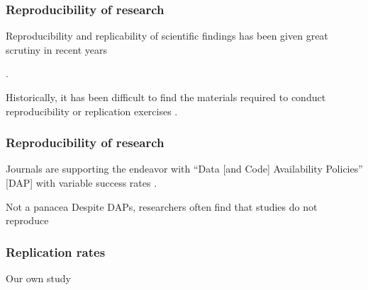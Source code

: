
\begin{frame}
  \frametitle{Reproducibility of research}

\begin{block}{Reproducibility and replicability of scientific findings has been given great scrutiny in recent years}

 .
\end{block}
\pause
\begin{block}{Historically, it has been difficult to find the materials required to conduct reproducibility or replication exercises}
	.  
\end{block}
\end{frame}


\begin{frame}
\frametitle{Reproducibility of research}
\begin{block}{Journals are supporting the endeavor with ``Data [and Code] Availability Policies'' [DAP]}
	with variable success rates
	. 
\end{block}	

\pause
\begin{block}{Not a panacea}
	Despite DAPs, researchers often find that studies do not reproduce 
	
\end{block}

\end{frame}


\begin{frame}
\frametitle{Replication rates}
\begin{block}{Our own study}
\end{block}
\end{frame}


